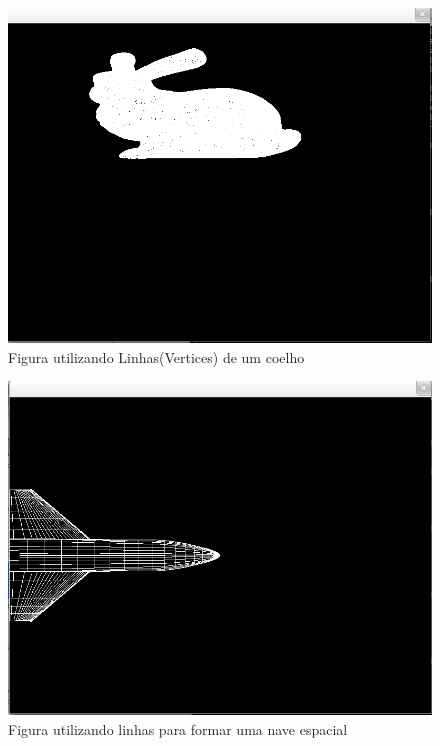 \documentclass[12pt]{article}
\begin{document}
\begin{figure}[!htb]
\centering
\includegraphics[scale=0.5]{images/rabit_line.png}
\caption{Figura utilizando Linhas(Vertices) de um coelho}
\end{figure}

\begin{figure}[!htb]
\centering
\includegraphics[scale=0.5]{images/space_shuttle_line.png}
\caption{Figura utilizando linhas para formar uma nave espacial}
\end{figure}
\end{document}
